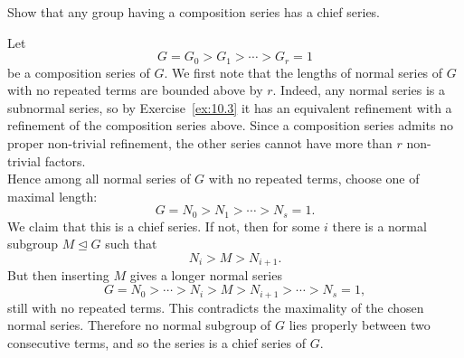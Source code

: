 \documentclass[../Odyssey_Project.tex]{subfiles}
\begin{document}
\begin{exercise}
\label{ex:10.6}
Show that any group having a composition series has a chief series.
\end{exercise}
\begin{solution}
Let
\[
  G=G_0>G_1>\cdots>G_r=1
\]
be a composition series of $G$. We first note that the lengths of normal series of $G$ with no repeated terms are bounded above by $r$. Indeed, any normal series is a subnormal series, so by Exercise~\ref{ex:10.3} it has an equivalent refinement with a refinement of the composition series above. Since a composition series admits no proper non-trivial refinement, the other series cannot have more than $r$ non-trivial factors.\\
Hence among all normal series of $G$ with no repeated terms, choose one of maximal length:
\[
  G=N_0>N_1>\cdots>N_s=1.
\]
We claim that this is a chief series. If not, then for some $i$ there is a normal subgroup $M\trianglelefteq G$ such that
\[
  N_i>M>N_{i+1}.
\]
But then inserting $M$ gives a longer normal series
\[
  G=N_0>\cdots>N_i>M>N_{i+1}>\cdots>N_s=1,
\]
still with no repeated terms. This contradicts the maximality of the chosen normal series. Therefore no normal subgroup of $G$ lies properly between two consecutive terms, and so the series is a chief series of $G$.
\end{solution}
\end{document}
